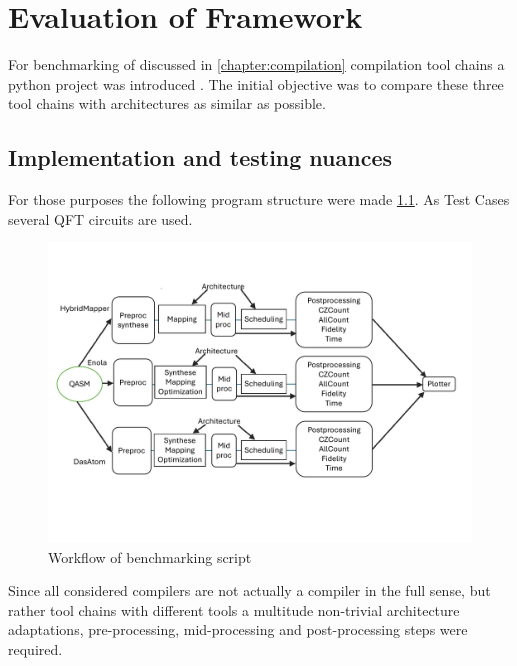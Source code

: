 
\chapter{Evaluation of Framework}\label{chapter:evaluation}
For benchmarking of discussed in \ref{chapter:compilation} compilation tool chains a python project was introduced \parencite{Emil_Khusainov_Bachelor_GIT}.
The initial objective was to compare these three tool chains with architectures as similar as possible.
\section{Implementation and testing nuances}
For those purposes the following program structure were made \ref{fig:overview}.
As Test Cases several \ac{QFT} circuits are used.
\begin{figure}[htbp]
  \centering
    \includegraphics[width=1.0\textwidth]{figures/schema.pdf}
    \caption{Workflow of benchmarking script}
    \label{fig:overview}
\end{figure}
Since all considered compilers are not actually a compiler in the full sense, but rather tool chains with different tools
a multitude non-trivial architecture adaptations, pre-processing, mid-processing and post-processing steps were required. 

